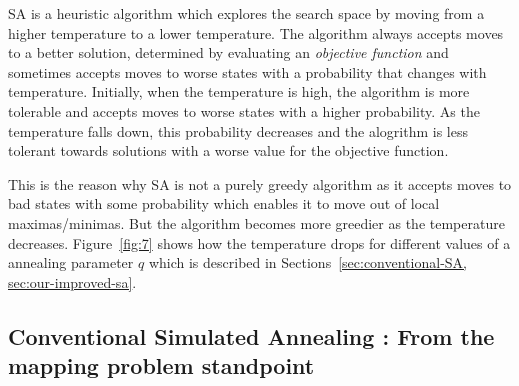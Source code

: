 SA is a heuristic algorithm which explores the search
space by moving from a higher temperature to a lower temperature. The algorithm
always accepts moves to a better solution, determined by evaluating an
\textit{objective function} and sometimes accepts moves to worse states with a
probability that changes with temperature. Initially, when the temperature is
high, the algorithm is more tolerable and accepts moves to worse states with a
higher probability. As the temperature falls down, this probability decreases
and the alogrithm is less tolerant towards solutions with a worse value for the
objective function.

This is the reason why SA is not a purely greedy algorithm as it accepts
moves to bad states with some probability which enables it to move out
of local maximas/minimas. But the algorithm becomes more greedier as the
temperature decreases. Figure~\ref{fig:7} shows how the temperature
drops for different values of a annealing parameter $q$ which is described in
Sections~\ref{sec:conventional-SA, sec:our-improved-sa}.


\subsection{Conventional Simulated Annealing : From the mapping problem standpoint}
\label{sec:conventional-SA}

